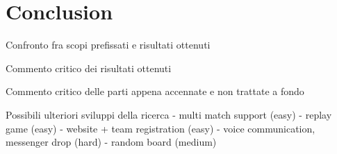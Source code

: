 \chapter{Conclusion}

	Confronto fra scopi prefissati e risultati ottenuti
	
	Commento critico dei risultati ottenuti
	
	Commento critico delle parti appena accennate e non trattate a fondo
	
	Possibili ulteriori sviluppi della ricerca
	- multi match support (easy)
	- replay game (easy)
	- website +  team registration (easy)
	- voice communication, messenger drop (hard)
	- random board (medium)